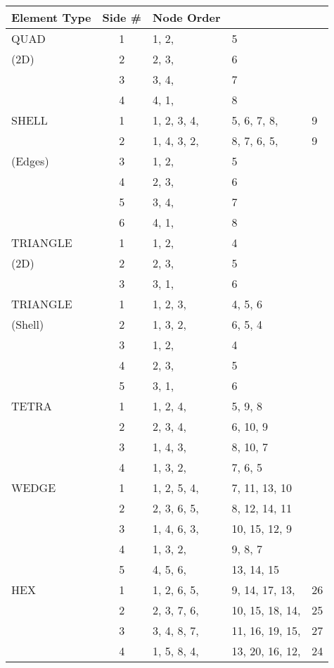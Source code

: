 \begin{table}
\begin{center}
\begin{tabular}{l|c|lll}
\hline \textbf{Element Type} & \textbf{Side \#}& \textbf{Node Order} \\ \hline
QUAD   & 1 & 1, 2, & 5 \\
(2D)   & 2 & 2, 3, & 6 \\
       & 3 & 3, 4, & 7 \\
       & 4 & 4, 1, & 8 \\ \hline
SHELL  & 1 & 1, 2, 3, 4, & 5, 6, 7, 8, & 9 \\
       & 2 & 1, 4, 3, 2, & 8, 7, 6, 5, & 9 \\
(Edges)& 3 & 1, 2, & 5 \\
       & 4 & 2, 3, & 6 \\
       & 5 & 3, 4, & 7 \\
       & 6 & 4, 1, & 8 \\ \hline
TRIANGLE&1 & 1, 2, & 4 \\
(2D)   & 2 & 2, 3, & 5 \\
       & 3 & 3, 1, & 6 \\ \hline
TRIANGLE& 1 & 1, 2, 3, & 4, 5, 6 \\
(Shell)& 2 & 1, 3, 2, & 6, 5, 4 \\
       & 3 & 1, 2,    & 4  \\
       & 4 & 2, 3,    & 5 \\
       & 5 & 3, 1,    & 6 \\ \hline
TETRA  & 1 & 1, 2, 4, & 5, 9, 8 \\
       & 2 & 2, 3, 4, & 6, 10, 9 \\
       & 3 & 1, 4, 3, & 8, 10, 7 \\
       & 4 & 1, 3, 2, & 7, 6, 5 \\ \hline
WEDGE  & 1 & 1, 2, 5, 4, & 7, 11, 13, 10 \\
       & 2 & 2, 3, 6, 5, & 8, 12, 14, 11 \\
       & 3 & 1, 4, 6, 3, & 10, 15, 12, 9 \\
       & 4 & 1, 3, 2, & 9, 8, 7 \\
       & 5 & 4, 5, 6, & 13, 14, 15 \\ \hline
HEX    & 1 & 1, 2, 6, 5, & 9, 14, 17, 13, & 26 \\
       & 2 & 2, 3, 7, 6, & 10, 15, 18, 14, & 25 \\
       & 3 & 3, 4, 8, 7, & 11, 16, 19, 15, & 27 \\
       & 4 & 1, 5, 8, 4, & 13, 20, 16, 12, & 24 \\

\end{tabular}
\end{center}
\end{table}

